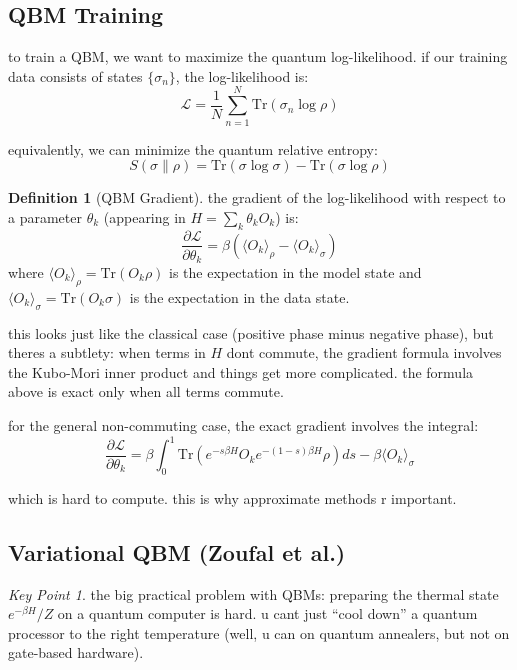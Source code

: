 \documentclass[11pt,a4paper]{article}
\theoremstyle{definition}
\newtheorem{definition}{Definition}[section]
\theoremstyle{remark}
\newtheorem*{keypoint}{Key Point}
\begin{document}
\subsection{QBM Training}

to train a QBM, we want to maximize the quantum log-likelihood. if our training data consists of states $\{\sigma_n\}$, the log-likelihood is:
\[
\mathcal{L} = \frac{1}{N} \sum_{n=1}^{N} \mathrm{Tr}(\sigma_n \log \rho)
\]

equivalently, we can minimize the quantum relative entropy:
\[
S(\sigma \| \rho) = \mathrm{Tr}(\sigma \log \sigma) - \mathrm{Tr}(\sigma \log \rho)
\]

\begin{definition}[QBM Gradient]
the gradient of the log-likelihood with respect to a parameter $\theta_k$ (appearing in $H = \sum_k \theta_k O_k$) is:
\[
\frac{\partial \mathcal{L}}{\partial \theta_k} = \beta \left( \langle O_k \rangle_{\rho} - \langle O_k \rangle_{\sigma} \right)
\]
where $\langle O_k \rangle_{\rho} = \mathrm{Tr}(O_k \rho)$ is the expectation in the model state and $\langle O_k \rangle_{\sigma} = \mathrm{Tr}(O_k \sigma)$ is the expectation in the data state.
\end{definition}

this looks just like the classical case (positive phase minus negative phase), but theres a subtlety: when terms in $H$ dont commute, the gradient formula involves the Kubo-Mori inner product and things get more complicated. the formula above is exact only when all terms commute.

for the general non-commuting case, the exact gradient involves the integral:
\[
\frac{\partial \mathcal{L}}{\partial \theta_k} = \beta \int_0^1 \mathrm{Tr}\left(e^{-s\beta H} O_k e^{-(1-s)\beta H} \rho\right) ds - \beta \langle O_k \rangle_{\sigma}
\]

which is hard to compute. this is why approximate methods r important.

\subsection{Variational QBM (Zoufal et al.)}

\begin{keypoint}
the big practical problem with QBMs: preparing the thermal state $e^{-\beta H}/Z$ on a quantum computer is hard. u cant just ``cool down'' a quantum processor to the right temperature (well, u can on quantum annealers, but not on gate-based hardware).
\end{keypoint}
\end{document}
